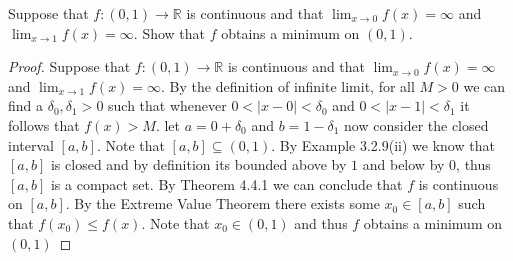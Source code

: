 \documentclass[12pt]{article}
\makeatletter
\theoremstyle{homework}
\newenvironment{exercise}[1]
{\def\@currentlabel{#1}\exercisecore}
{\endexercisecore}
\newcommand{\Reals}{\ensuremath{\mathbb R}}
\makeatother
\begin{document}
\begin{exercise}{5} Suppose that $f: (0,1) \to \Reals$ is continuous and that $\lim_{x \to 0}f(x) = \infty$ and $\lim_{x \to 1}f(x) = \infty$. Show that $f$ obtains a minimum on $(0,1)$.\\

  \begin{proof} 
    Suppose that $f: (0,1) \to \Reals$ is continuous and that $\lim_{x \to 0}f(x) = \infty$ and $\lim_{x \to 1}f(x) = \infty$. By the definition of infinite limit, for all $M>0$ we can find a $\delta_0, \delta_1 > 0$
    such that whenever $0< |x - 0| < \delta_0$ and $0< |x - 1| < \delta_1$ it follows that $f(x)>M$. let $a = 0 +\delta_0$ and $b = 1 - \delta_1$ now consider the closed interval $[a , b]$.
    Note that $[a , b] \subseteq (0,1)$. By Example 3.2.9(ii) we know that $[a,b]$ is closed and by definition its bounded above by $1$ and below by $0$, thus $[a,b]$ is a compact set. By Theorem 4.4.1 we can conclude that $f$ is continuous on $[a,b]$.  
    By the Extreme Value Theorem there exists some $x_0 \in [a , b]$ such that $f(x_0) \le f(x)$. Note that $x_0 \in (0,1)$ and thus $f$ obtains a minimum on $(0,1)$
  \end{proof}
  \end{exercise}
\vspace{.5in}
\end{document}
